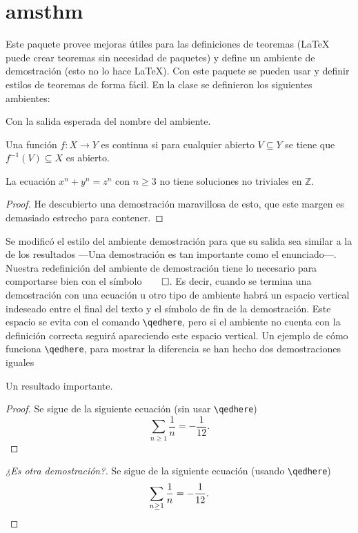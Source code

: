 \section{amsthm}
Este paquete provee mejoras útiles para las definiciones de teoremas
(\LaTeX{} puede crear teoremas sin necesidad de paquetes) y
define un ambiente de demostración (esto no lo hace \LaTeX{}). Con este
paquete se pueden usar y definir estilos de teoremas de forma fácil. En la clase se definieron los siguientes ambientes:
\begin{center}
\end{center}
Con la salida esperada del nombre del ambiente.

\begin{definicion}
  Una función \(f\colon X\to Y\) es continua si para cualquier abierto
  \(V\subseteq Y\) se tiene que \(f^{-1}(V)\subseteq X\) es abierto.
\end{definicion}

\begin{teorema}[Fermat]%
\label{teo:fermat}
  La ecuación \(x^n + y^n = z^n\) con \(n\geq 3\) no tiene soluciones no triviales en \(\mathbb{Z}\).
\end{teorema}
\begin{proof}
  He descubierto una demostración maravillosa de esto, que este margen es
  demasiado estrecho para contener.
\end{proof}

Se modificó el estilo del ambiente demostración para que su salida sea similar a la de los resultados —Una demostración es tan importante como el
enunciado—. Nuestra redefinición del ambiente de demostración tiene lo necesario para comportarse bien con el símbolo\(\qed \). Es decir, cuando se termina una demostración con una ecuación u otro tipo de ambiente habrá
un espacio vertical indeseado entre el final del texto y el símbolo de fin de la demostración. Este espacio se evita con el comando \verb|\qedhere|, pero si el ambiente no cuenta con la definición correcta seguirá
apareciendo este espacio vertical. Un ejemplo de cómo funciona \verb|\qedhere|, para mostrar la diferencia se han hecho dos demostraciones iguales

\begin{teorema}
  Un resultado importante.
\end{teorema}
\begin{proof}
  Se sigue de la siguiente ecuación (sin usar \verb|\qedhere|)
  \[
    \sum_{n\geq 1}\frac{1}{n}=-\frac{1}{12}.
  \]
\end{proof}
\begin{proof}[¿Es otra demostración?]
  Se sigue de la siguiente ecuación (usando \verb|\qedhere|)
  \[
    \sum_{n\geq 1}\frac{1}{n}=-\frac{1}{12}. \qedhere
  \]
\end{proof}

